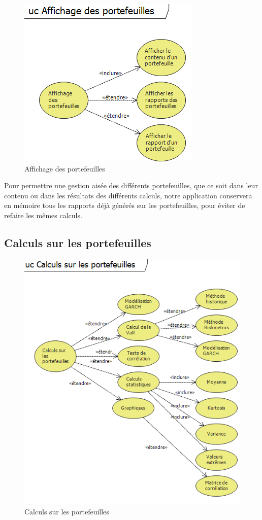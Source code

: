\documentclass[a4paper]{report}
\begin{document}
\begin{figure}[H]
  \center
  \includegraphics[scale=1]{Rapport.png}
  \caption{Affichage des portefeuilles}
\end{figure}

Pour permettre une gestion aisée des différents portefeuilles, que ce soit dans leur contenu ou dans les résultats des différents calculs, notre application conservera en mémoire tous les rapports déjà générés sur les portefeuilles, pour éviter de refaire les mêmes calculs.

\subsection{Calculs sur les portefeuilles}
\begin{figure}[H]
  \center
  \includegraphics[width=1\textwidth]{VaR.png}
  \caption{Calculs sur les portefeuilles}
\end{figure}
\end{document}
